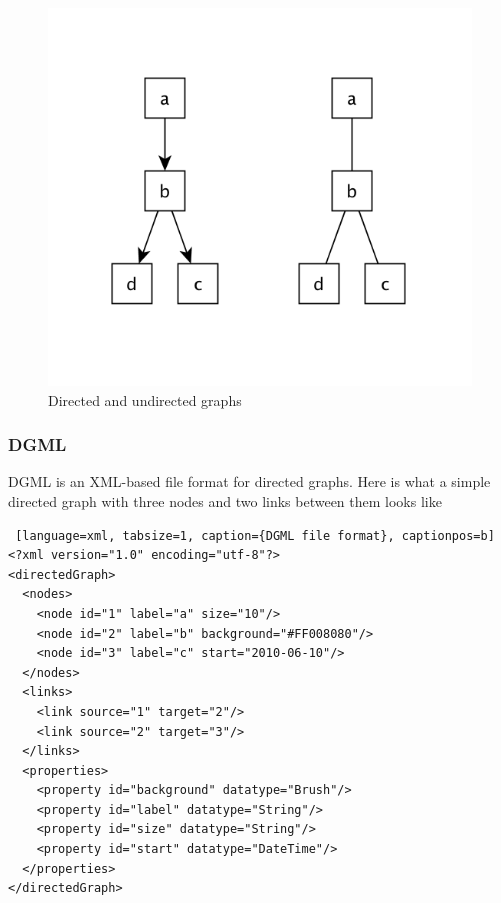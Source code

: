 \begin{figure}[h!]
\centering
\includegraphics[scale=0.5]{pictures/dot_graph.png}
\caption{Directed and undirected graphs}
\label{fig:dot_graphs}
\end{figure}

\subsubsection{DGML}
DGML is an XML-based file format for directed graphs. Here is what a simple directed graph with three nodes and two links between them looks like

\begin{center}
\renewcommand{\thelstlisting}{\thesection.\arabic{lstlisting}}
\begin{lstlisting} [language=xml, tabsize=1, caption={DGML file format}, captionpos=b]
<?xml version="1.0" encoding="utf-8"?>
<directedGraph>
  <nodes>
    <node id="1" label="a" size="10"/>
    <node id="2" label="b" background="#FF008080"/>
    <node id="3" label="c" start="2010-06-10"/>
  </nodes>
  <links>
    <link source="1" target="2"/>
    <link source="2" target="3"/>
  </links>
  <properties>
    <property id="background" datatype="Brush"/>
    <property id="label" datatype="String"/>
    <property id="size" datatype="String"/>
    <property id="start" datatype="DateTime"/>
  </properties>
</directedGraph>
\end{lstlisting}
\end{center}

